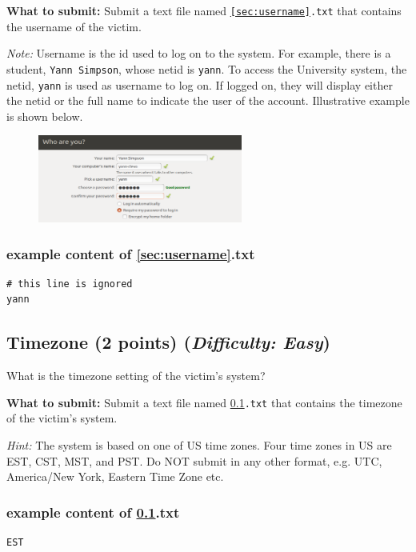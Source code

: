 \documentclass[letterpaper,12pt]{report}
\begin{document}
\medskip 
\textbf{What to submit:} Submit a text file named \texttt{\ref{sec:username}.txt} that contains the username of the victim.

\medskip
\textit{Note:} Username is the id used to log on to the system. For example, there is a student, \texttt{Yann Simpson}, whose netid is \texttt{yann}. To access the University system, the netid, \texttt{yann} is used as username to log on. If logged on, they will display either the netid or the full name to indicate the user of the account. Illustrative example is shown below.

\begin{figure}[H]
  \centering
  \includegraphics[width=0.6\textwidth]{unix_username.png}
\end{figure}

\subsubsection*{example content of {\ref{sec:username}.txt}}
\begin{mdframed}
\begin{Verbatim}
# this line is ignored
yann
\end{Verbatim}
\end{mdframed}

\subsection{Timezone (2 points)    \hfill\rm\normalsize (\emph{Difficulty: Easy})}
\label{sec:timezone}
What is the timezone setting of the victim's system? 

\medskip 
\textbf{What to submit:} Submit a text file named \texttt{\ref{sec:timezone}.txt} that contains the timezone of the victim's system.

\medskip
\textit{Hint:} The system is based on one of US time zones. Four time zones in US are EST, CST, MST, and PST. Do NOT submit in any other format, e.g. UTC, America/New York, Eastern Time Zone etc.

\subsubsection*{example content of {\ref{sec:timezone}.txt}}
\begin{mdframed}
\begin{Verbatim}
EST
\end{Verbatim}
\end{mdframed}
\end{document}
